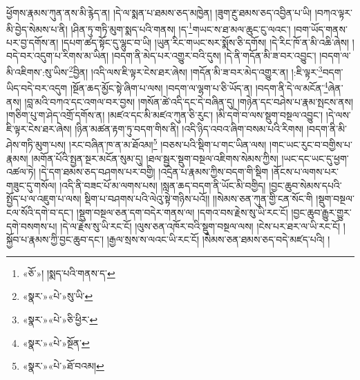 ཕྱོགས་རྣམས་ཀུན་ནས་མི་རྙེད་ན། །དེ་ལ་སྨན་པ་ཐམས་ཅད་མཁྱེན། །ཟུག་རྔུ་ཐམས་ཅད་འབྱིན་པ་ཡི། །བཀའ་ལྟར་མི་བྱེད་སེམས་པ་ནི། །ཤིན་ཏུ་གཏི་མུག་སྨད་པའི་གནས། །ད་\footnote{«ཅོ་»། །སྨད་པའི་གནས་ད་}གཡང་ས་ཐ་མལ་ཆུང་ངུ་ལའང་། །བག་ཡོད་གནས་པར་བྱ་དགོས་ན། །དཔག་ཚད་སྟོང་དུ་ལྷུང་བ་ཡི། །ཡུན་རིང་གཡང་སར་སྨོས་ཅི་དགོས། །དེ་རིང་ཁོ་ན་མི་འཆི་ཞེས། །བདེ་བར་འདུག་པ་རིགས་མ་ཡིན། །བདག་ནི་མེད་པར་འགྱུར་བའི་དུས། །དེ་ནི་གདོན་མི་ཟ་བར་འབྱུང་། །བདག་ལ་མི་འཇིགས་:སུ་ཡིས་\footnote{«སྣར་»«པེ་»སུ་ཡི་}བྱིན། །འདི་ལས་ཇི་ལྟར་ངེས་ཐར་ཞེས། །གདོན་མི་ཟ་བར་མེད་འགྱུར་ན། །:ཇི་ལྟར་\footnote{«སྣར་»«པེ་»ཅི་ཕྱིར་}བདག་ཡིད་བདེ་བར་འདུག །སྔོན་ཆད་མྱོང་སྟེ་ཞིག་པ་ལས། །བདག་ལ་ལྷག་པ་ཅི་ཡོད་ན། །བདག་ནི་དེ་ལ་མངོན་\footnote{«སྣར་»«པེ་»སྔོན་}ཞེན་ནས། །བླ་མའི་བཀའ་དང་འགལ་བར་བྱས། །གསོན་ཚེ་འདི་དང་དེ་བཞིན་དུ། །གཉེན་དང་བཤེས་པ་རྣམ་སྤངས་ནས། །གཅིག་པུ་ག་ཤེད་འགྲོ་དགོས་ན། །མཛའ་དང་མི་མཛའ་ཀུན་ཅི་རུང་། །མི་དགེ་བ་ལས་སྡུག་བསྔལ་འབྱུང་། །དེ་ལས་ཇི་ལྟར་ངེས་ཐར་ཞེས། །ཉིན་མཚན་རྟག་ཏུ་བདག་གིས་ནི། །འདི་ཉིད་འབའ་ཞིག་བསམ་པའི་རིགས། །བདག་ནི་མི་ཤེས་གཏི་མུག་པས། །རང་བཞིན་ཁ་ན་མ་ཐོའམ།\footnote{«སྣར་»«པེ་»ཐོ་བའམ།} །བཅས་པའི་སྡིག་པ་གང་ཡིན་ལས། །གང་ཡང་རུང་བ་བགྱིས་པ་རྣམས། །མགོན་པོའི་སྤྱན་སྔར་མངོན་སུམ་དུ། །ཐལ་སྦྱར་སྡུག་བསྔལ་འཇིགས་སེམས་ཀྱིས། །ཡང་དང་ཡང་དུ་ཕྱག་འཚལ་ཏེ། །དེ་དག་ཐམས་ཅད་བཤགས་པར་བགྱི། །འདྲེན་པ་རྣམས་ཀྱིས་བདག་གི་སྡིག །ནོངས་པ་ལགས་པར་གཟུང་དུ་གསོལ། །འདི་ནི་བཟང་པོ་མ་ལགས་པས། །སླན་ཆད་བདག་ནི་ཡོང་མི་བགྱིད། །བྱང་ཆུབ་སེམས་དཔའི་སྤྱོད་པ་ལ་འཇུག་པ་ལས། སྡིག་པ་བཤགས་པའི་ལེའུ་སྟེ་གཉིས་པའོ།། །།སེམས་ཅན་ཀུན་གྱི་ངན་སོང་གི །སྡུག་བསྔལ་ངལ་སོའི་དགེ་བ་དང་། །སྡུག་བསྔལ་ཅན་དག་བདེར་གནས་ལ། །དགའ་བས་རྗེས་སུ་ཡི་རང་ངོ། །བྱང་ཆུབ་རྒྱུར་གྱུར་དགེ་བསགས་པ། །དེ་ལ་རྗེས་སུ་ཡི་རང་ངོ། །ལུས་ཅན་འཁོར་བའི་སྡུག་བསྔལ་ལས། །ངེས་པར་ཐར་ལ་ཡི་རང་ངོ། །སྐྱོབ་པ་རྣམས་ཀྱི་བྱང་ཆུབ་དང་། །རྒྱལ་སྲས་ས་ལའང་ཡི་རང་ངོ། །སེམས་ཅན་ཐམས་ཅད་བདེ་མཛད་པའི། །
